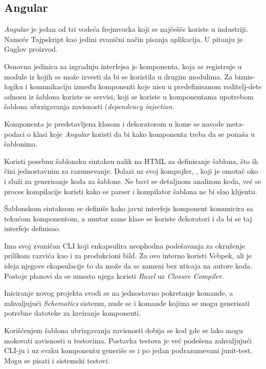 \subsection{Angular}

\textsl{Angular} je jedan od tri vodeća frejmvorka koji se najčešće koriste u industriji.
Nameće Tajpskript kao jedini zvanični način pisanja aplikacija.
U pitanju je Guglov proizvod.

Osnovna jedinica za izgradnju interfejsa je komponenta, koja se registruje u module iz kojih se može izvesti da bi se koristila u drugim modulima.
Za biznis-logiku i komunikaciju između komponenti koje nisu u predefinisanom roditelj-dete odnosu iz šablona koriste se servisi, koji se koriste u komponentama upotrebom šablona ubrzigavanja zavisnosti (\textsl{dependency injection}.

Komponenta je predstavljena klasom i dekoratorom  u kome se navode meta-podaci o klasi koje \textsl{Angular} koristi da bi  kako komponenta treba da se ponaša u šablonima.

Koristi posebnu šablonsku sintaksu nalik na HTML za definisanje šablona, što ih čini jednostavnim za razumevanje.
Dolazi uz svoj kompajler, , koji je omotač oko  i služi za generisanje koda za šablone.
Ne bavi se detaljnom analizom koda, već se proces kompilacije koristi kako se parser i kompilator šablona ne bi slao klijentu.

Šablonskom sintaksom se definiše kako javni interfejs komponent komunicira sa tekućom komponentom, a unutar same klase se koriste dekoratori  i  da bi se taj interfejs definisao.

Ima svoj zvaničan CLI koji enkapsulira neophodna podešavanja za okruženje prilikom razvića kao i za produkcioni bild.
Za ovo interno koristi Vebpek, ali je ideja njegove ekapsulacije to da može da se zameni bez uticaja na autore koda.
Postoje planovi da se umesto njega koristi \textsl{Bazel} uz \textsl{Closure Compiler}.

Iniciranje novog projekta svodi se na jednostavno pokretanje komande, a zahvaljujući \textsl{Schematics} sistemu, nude se i komande kojima se mogu generisati potrebne datoteke za kreiranje komponenti.

Korišćenjem šablona ubrizgavanja zavisnosti dobija se kod gde se lako mogu mokovati zavisnosti u testovima.
Postavka testova je već podešena zahvaljujući CLI-ju i uz svaku komponentu generiše se i po jedan podrazumevani junit-test.
Mogu se pisati i sistemski testovi.

